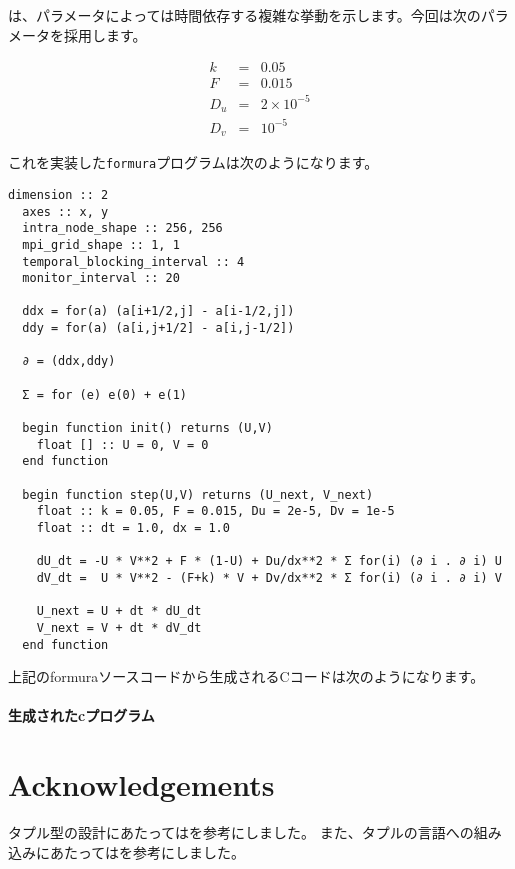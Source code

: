 \documentclass{jsarticle}
\newcommand{\formura}{{\texttt{formura}}}
\begin{document}
は、パラメータによっては時間依存する複雑な挙動を示します。今回は次のパラメータを採用します。

\begin{eqnarray}
  k &=& 0.05\\
  F &=& 0.015\\
  D_u &=& 2 \times 10^{-5}\\
  D_v &=& 10^{-5}
\end{eqnarray}

これを実装した\formura プログラムは次のようになります。

\begin{lstlisting}[mathescape]
  dimension :: 2
  axes :: x, y
  intra_node_shape :: 256, 256
  mpi_grid_shape :: 1, 1
  temporal_blocking_interval :: 4
  monitor_interval :: 20

  ddx = for(a) (a[i+1/2,j] - a[i-1/2,j])
  ddy = for(a) (a[i,j+1/2] - a[i,j-1/2])

  ∂ = (ddx,ddy)

  Σ = for (e) e(0) + e(1)

  begin function init() returns (U,V)
    float [] :: U = 0, V = 0
  end function

  begin function step(U,V) returns (U_next, V_next)
    float :: k = 0.05, F = 0.015, Du = 2e-5, Dv = 1e-5
    float :: dt = 1.0, dx = 1.0

    dU_dt = -U * V**2 + F * (1-U) + Du/dx**2 * Σ for(i) (∂ i . ∂ i) U
    dV_dt =  U * V**2 - (F+k) * V + Dv/dx**2 * Σ for(i) (∂ i . ∂ i) V

    U_next = U + dt * dU_dt
    V_next = V + dt * dV_dt
  end function
\end{lstlisting}


上記のformuraソースコードから生成されるCコードは次のようになります。

\paragraph{生成されたcプログラム}







\newpage



\section*{Acknowledgements}

タプル型の設計にあたっては\citet{pierce2002types}を参考にしました。
また、タプルの言語への組み込みにあたっては\citet{oliveira2015modular}を参考にしました。





\end{document}
